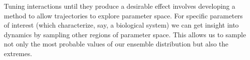 \documentclass[11pt]{article}
\begin{document}





Tuning interactions until they produce a desirable effect involves developing a method to allow trajectories to explore parameter space. For specific parameters of interest (which characterize, say, a biological system) we can get insight into dynamics by sampling other regions of parameter space.  This allows us to sample not only the most probable values of our ensemble distribution but also the extremes.   %
\end{document}
